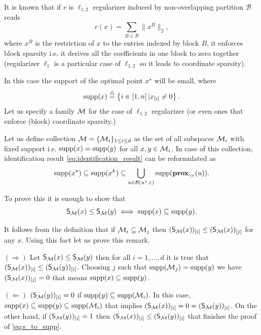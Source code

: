 \begin{example}
    It is known that if $r$ is $\ell_{1,2}$ regularizer induced by non-overlapping partition $\mathcal{B}$ reads
    \begin{equation}\label{eq:l12}
         r(x) = \sum\limits_{B\in\mathcal{B}}\|x^B\|_2, 
    \end{equation}
    where $x^B$ is the restriction of $x$ to the entries indexed by block $B$, it enforces block sparsity i.e. it derives all the coefficients in one block to zero together (regularizer $\ell_1$ is a particular case of $\ell_{1,2}$ so it leads to coordinate sparsity).
    
    In this case the support of the optimal point $x^\star$ will be small, where 
    \begin{equation}\label{eq:supp}
        \supp(x) \stackrel{\triangle}{=}\left\{i\in [1,n]\,| x_{[i]} \neq 0 \right\}.
    \end{equation}
    Let us specify a family $\M$ for the case of $\ell_{1,2}$ regularizer (or even ones that enforce (block) coordinate sparsity.)
    
    Let us define collection $\M = \{\M_i\}_{1\leq i\leq d}$ as the set of all subspaces $\M_i$ with fixed support i.e. $\supp(x) = \supp(y)$ for all $x,y\in \M_i$. In case of this collection, identification result \eqref{eq:identification_result} can be reformulated as
    \begin{equation}\label{eq:ident_l1}
        \supp(x^\star) \subseteq \supp(x^k) \subseteq \bigcup_{u\in\mathcal{B}(u^\star,\varepsilon)} \supp(\prox_{\gamma r}(u)).
    \end{equation}
    
    To prove this it is enough to show that
    \begin{equation}\label{eq:s_to_supp}
        \S(x)\leq\S(y) \iff \supp(x)\subseteq\supp(y).
    \end{equation}
    
    It follows from the definition that if $\M_i\subseteq \M_j$ then $(\S(x))_{[i]}\leq(\S(x))_{[j]}$ for any $x$. Using this fact let us prove this remark.
    
    $(\Rightarrow)$ Let  $\S(x)\leq\S(y)$ then for all $i = 1,\dots,d$ it is true that $(\S(x))_{[i]}\leq(\S(y))_{[i]}$. Choosing $j$ such that $\supp(\M_j) = \supp(y)$ we have $(\S(x))_{[j]}= 0$ that means $\supp(x)\subseteq\supp(y)$.
    
    $(\Leftarrow)$ $(\S(y))_{[i]} = 0$ if $\supp(y)\subseteq\supp(\M_i)$. In this case, $\supp(x)\subseteq\supp(y)\subseteq\supp(\M_i)$ that implies $(\S(x))_{[i]} = 0 = (\S(y))_{[i]}$. On the other hand, if $(\S(y))_{[i]} = 1$ then $(\S(x))_{[i]}\leq(\S(y))_{[i]}$ that finishes the proof of \eqref{eq:s_to_supp}.
\end{example}

